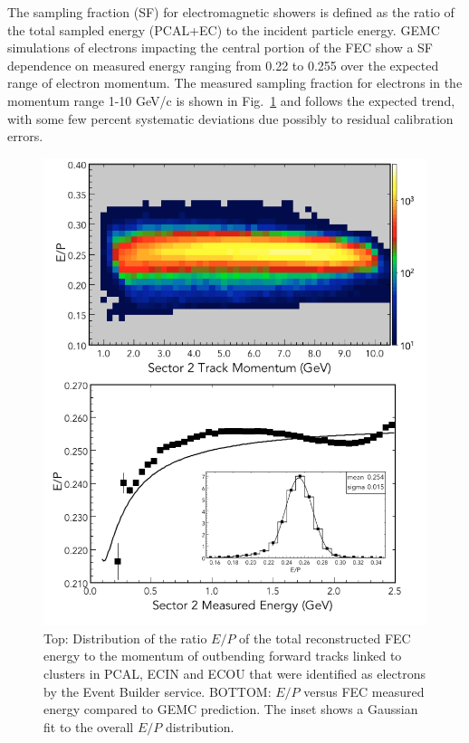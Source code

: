 The sampling fraction (SF) for electromagnetic showers is defined as the ratio of the total sampled energy (PCAL+EC) to the incident particle energy.  GEMC simulations of electrons impacting the central portion of the FEC show a SF dependence on measured energy ranging from 0.22 to 0.255 over the expected range of electron momentum.  The measured sampling fraction for electrons in the momentum range 1-10 GeV/c is shown in Fig.~\ref{fig:S10_1_0} and follows the expected trend, with some few percent systematic deviations due possibly to residual calibration errors.

\begin{figure}[t]
\centering
\includegraphics[width=1.0\columnwidth,keepaspectratio]{img/S10_1_0.png}
\caption[]{Top: Distribution of the ratio $E/P$ of the total reconstructed FEC energy to the momentum of outbending forward tracks linked to clusters in PCAL, ECIN and ECOU that were identified as electrons by the Event Builder service.  BOTTOM: $E/P$ versus FEC measured energy compared to GEMC prediction.  The inset shows a Gaussian fit to the overall $E/P$ distribution.}
\label{fig:S10_1_0}
\end{figure}

